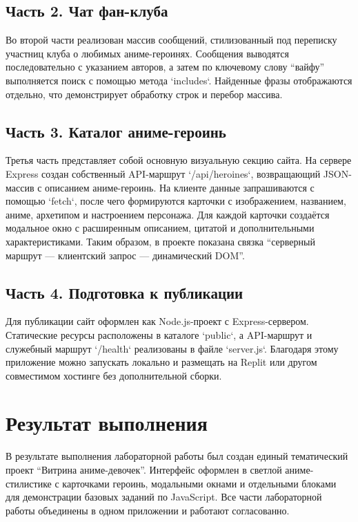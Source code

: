 \subsection{Часть 2. Чат фан-клуба}

Во второй части реализован массив сообщений, стилизованный под переписку участниц клуба о любимых аниме-героинях. Сообщения выводятся последовательно с указанием авторов, а затем по ключевому слову ``вайфу'' выполняется поиск с помощью метода `includes`. Найденные фразы отображаются отдельно, что демонстрирует обработку строк и перебор массива.

\subsection{Часть 3. Каталог аниме-героинь}

Третья часть представляет собой основную визуальную секцию сайта. На сервере Express создан собственный API-маршрут `/api/heroines`, возвращающий JSON-массив с описанием аниме-героинь. На клиенте данные запрашиваются с помощью `fetch`, после чего формируются карточки с изображением, названием, аниме, архетипом и настроением персонажа. Для каждой карточки создаётся модальное окно с расширенным описанием, цитатой и дополнительными характеристиками. Таким образом, в проекте показана связка ``серверный маршрут --- клиентский запрос --- динамический DOM''.

\subsection{Часть 4. Подготовка к публикации}

Для публикации сайт оформлен как Node.js-проект с Express-сервером. Статические ресурсы расположены в каталоге `public`, а API-маршрут и служебный маршрут `/health` реализованы в файле `server.js`. Благодаря этому приложение можно запускать локально и размещать на Replit или другом совместимом хостинге без дополнительной сборки.

\section{Результат выполнения}

В результате выполнения лабораторной работы был создан единый тематический проект ``Витрина аниме-девочек''. Интерфейс оформлен в светлой аниме-стилистике с карточками героинь, модальными окнами и отдельными блоками для демонстрации базовых заданий по JavaScript. Все части лабораторной работы объединены в одном приложении и работают согласованно.

